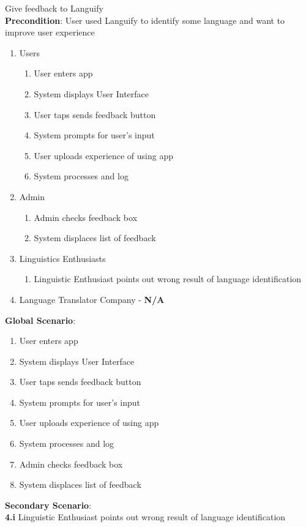 \item Give feedback to Languify
	\\ \textbf{Precondition}: User used Languify to identify some language and want to improve user experience
	\begin{enumerate}[{\bf VP1.}]
		\item Users
		\begin{enumerate}[{\bf 1.}]
			\item User enters app
			\item System displays User Interface
			\item User taps sends feedback button
			\item System prompts for user’s input
			\item User uploads experience of using app
			\item System processes and log
			
		\end{enumerate}
		\item Admin
		\begin{enumerate}[{\bf 1.}, resume]
			\item Admin checks feedback box
			\item System displaces list of feedback
			
		\end{enumerate}
		\item Linguistics Enthusiasts
		\begin{enumerate}[{\bf 4.i}]
			\item Linguistic Enthusiast points out wrong result of language identification
		\end{enumerate}
		\item Language Translator Company - \textbf{N/A}
	\end{enumerate}
	\textbf{Global Scenario}:
	\begin{enumerate}[{\bf 1.}]
		\item User enters app
		\item System displays User Interface
		\item User taps sends feedback button
		\item System prompts for user’s input
		\item User uploads experience of using app
		\item System processes and log
		\item Admin checks feedback box
		\item System displaces list of feedback
	\end{enumerate}
	\textbf{Secondary Scenario}:
		\\ \textbf{4.i} Linguistic Enthusiast points out wrong result of language identification
